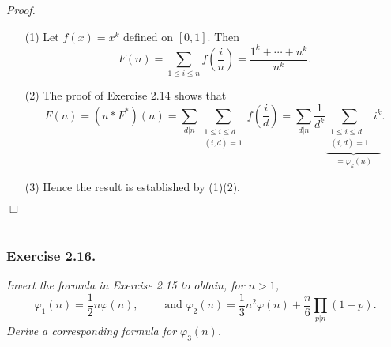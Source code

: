\documentclass{article}
\begin{document}
\emph{Proof.}
\begin{enumerate}
\item[(1)]
  Let $f(x) = x^k$ defined on $[0,1]$.
  Then
  \[
    F(n)
    = \sum_{1 \leq i \leq n} f\left( \frac{i}{n} \right)
    = \frac{1^k + \cdots + n^k}{n^k}.
  \]

\item[(2)]
  The proof of Exercise 2.14 shows that
  \[
    F(n)
    = (u * F^{*})(n)
    = \sum_{d|n} \sum_{\substack{1 \leq i \leq d \\ (i,d)=1}} f\left( \frac{i}{d} \right)
    = \sum_{d|n} \frac{1}{d^k}
      \underbrace{\sum_{\substack{1 \leq i \leq d \\ (i,d)=1}} i^k}_{= \varphi_k(n)}.
  \]

\item[(3)]
  Hence the result is established by (1)(2).
\end{enumerate}
$\Box$ \\\\






\subsubsection*{Exercise 2.16.}
\emph{Invert the formula in Exercise 2.15 to obtain, for $n > 1$,
\[
  \varphi_1(n) = \frac{1}{2}n\varphi(n),
  \qquad\text{ and }
  \varphi_2(n) = \frac{1}{3}n^2 \varphi(n) + \frac{n}{6} \prod_{p|n}(1-p).
\]
Derive a corresponding formula for $\varphi_3(n)$.} \\
\end{document}
